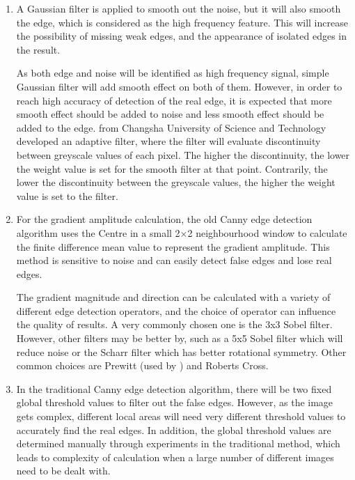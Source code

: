 \begin{enumerate}
    \item A Gaussian filter is applied to smooth out the noise, but it will also smooth the edge, which is considered as the high frequency feature. This will increase the possibility of missing weak edges, and the appearance of isolated edges in the result.

    As both edge and noise will be identified as high frequency signal, simple Gaussian filter will add smooth effect on both of them. However, in order to reach high accuracy of detection of the real edge, it is expected that more smooth effect should be added to noise and less smooth effect should be added to the edge. \cite{wang09} from Changsha University of Science and Technology developed an adaptive filter, where the filter will evaluate discontinuity between greyscale values of each pixel. The higher the discontinuity, the lower the weight value is set for the smooth filter at that point. Contrarily, the lower the discontinuity between the greyscale values, the higher the weight value is set to the filter.

    \item For the gradient amplitude calculation, the old Canny edge detection algorithm uses the Centre in a small 2×2 neighbourhood window to calculate the finite difference mean value to represent the gradient amplitude. This method is sensitive to noise and can easily detect false edges and lose real edges.

    The gradient magnitude and direction can be calculated with a variety of different edge detection operators, and the choice of operator can influence the quality of results. A very commonly chosen one is the 3x3 Sobel filter. However, other filters may be better by, such as a 5x5 Sobel filter which will reduce noise or the Scharr filter which has better rotational symmetry. Other common choices are Prewitt (used by \cite{zhou11}) and Roberts Cross.

    \item In the traditional Canny edge detection algorithm, there will be two fixed global threshold values to filter out the false edges. However, as the image gets complex, different local areas will need very different threshold values to accurately find the real edges. In addition, the global threshold values are determined manually through experiments in the traditional method, which leads to complexity of calculation when a large number of different images need to be dealt with.


\end{enumerate}
